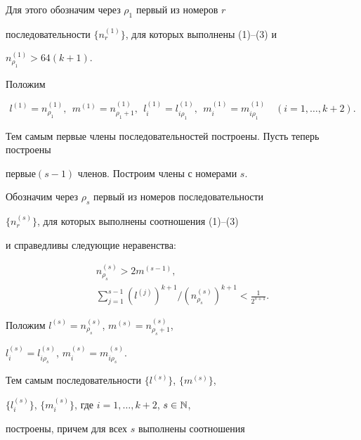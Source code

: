 Для этого обозначим через ${\rho_1}$ первый из номеров $r$ 


последовательности  $\{n_r^{(1)}\}$, для которых выполнены (1)--(3) и 


$n_{\rho_1}^{(1)}>64 (k+1)$.





Положим


$$


l^{(1)}=n_{\rho_1}^{(1)}, \ \ m^{(1)}=n_{\rho_1+1}^{(1)},


\ \ l_i^{(1)}=l_{i \rho_1}^{(1)},\ \ m_i^{(1)}=m_{i \rho_1}^{(1)}


\quad (i=1, \dotsc, k+2).


$$


Тем самым первые члены последовательностей построены. Пусть теперь построены 


первые\linebreak $(s-1)$ членов. Построим члены с номерами $s$.





Обозначим через $\rho_s$ первый из номеров последовательности


$\{n_r^{(s)} \}$, для которых выполнены соотношения (1)--(3)


и справедливы следующие неравенства: 


\begin{gather*}


n_{\rho_s}^{(s)}>2m^{(s-1)}, \\


\sum_{j=1}^{s-1}(l^{(j)})^{k+1}\Big/ (n_{\rho_s}^{(s)})^{k+1}<\frac{1}{2^{s+1}}. 


\end{gather*}


Положим $l^{(s)}=n_{\rho_s}^{(s)}$, $m^{(s)}=n_{\rho_s+1}^{(s)}$,


$l_i^{(s)}=l_{i \rho_s}^{(s)}$, $m_i^{(s)}=m_{i \rho_s}^{(s)}$.





Тем самым последовательности $\{l^{(s)} \}$, $\{m^{(s)} \}$, 


$\{l_i^{(s)} \}$, $\{m_i^{(s)} \}$, где $i=1,\dotsc, k+2$, $s \in \Bbb N$,


построены, причем для всех $s$ выполнены соотношения


